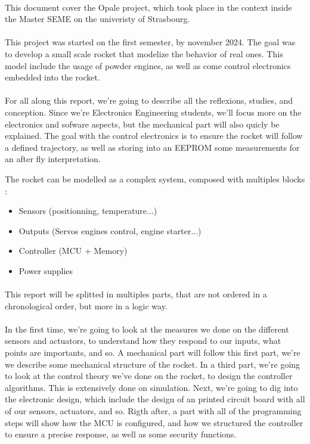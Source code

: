 \paragraph{}
This document cover the Opale project, which took place in the context inside the Master SEME
on the univeristy of Strasbourg.

\paragraph{}
This project was started on the first semester, by november 2024. The goal was to develop a 
small scale rocket that modelize the behavior of real ones. This model include the usage 
of powder engines, as well as come control electronics embedded into the rocket.

\paragraph{}
For all along this report, we're going to describe all the reflexions, studies, and conception.
Since we're Electronics Engineering students, we'll focus more on the electronics and sofware aspects, 
but the mechanical part will also quicly be explained.
The goal with the control electronics is to ensure the rocket will follow a defined trajectory, as 
well as storing into an EEPROM some measurements for an after fly interpretation.

The rocket can be modelled as a complex system, composed with multiples blocks : 

\begin{itemize}
    \item   Sensors (positionning, temperature...)
    \item   Outputs (Servos engines control, engine starter...)
    \item   Controller (MCU + Memory)
    \item   Power supplies
\end{itemize}

\paragraph{}
This report will be splitted in multiples parts, that are not ordered in a chronological order, but 
more in a logic way.

\paragraph{}
In the first time, we're going to look at the measures we done on the different sensors and actuators, to understand
how they respond to our inputs, what points are importants, and so.
A mechanical part will follow this first part, we're we describe some mechanical structure of the rocket. 
In a third part, we're going to look at the control theory we've done on the rocket, to design the 
controller algorithms. This is extensively done on simulation.
Next, we're going to dig into the electronic design, which include the design of an printed
circuit board with all of our sensors, actuators, and so.
Rigth after, a part with all of the programming steps will show how the MCU is configured, and how we structured the 
controller to ensure a precise response, as well as some security functions.